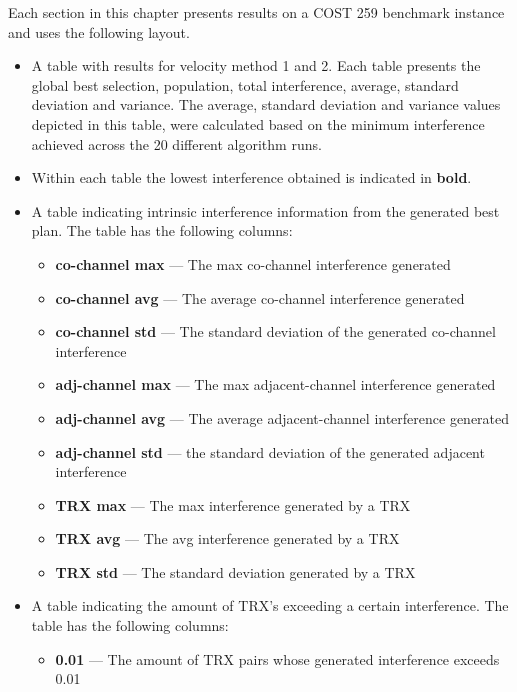 Each section in this chapter presents results on a \gls{COST} 259 benchmark instance and uses the following layout.
\begin{itemize}
        \item A table with results for velocity method 1 and 2. Each table presents the global best selection, population, total interference, average, standard deviation and variance. The average, standard deviation and variance values depicted in this table, were calculated based on the minimum interference achieved across the 20 different algorithm runs.
        \item Within each table the lowest interference obtained is indicated in \textbf{bold}.
        \item A table indicating intrinsic interference information from the generated best plan. The table has the following columns:
            \begin{itemize}
                \item{\textbf{co-channel max}} --- The max co-channel interference generated
                \item{\textbf{co-channel avg}} --- The average co-channel interference generated
                \item{\textbf{co-channel std}} --- The standard deviation of the generated co-channel interference
                \item{\textbf{adj-channel max}} --- The max adjacent-channel interference generated
                \item{\textbf{adj-channel avg}} --- The average adjacent-channel interference generated
                \item{\textbf{adj-channel std}} --- the standard deviation of the generated adjacent interference
                \item{\textbf{TRX max}} --- The max interference generated by a TRX
                \item{\textbf{TRX avg}} --- The avg interference generated by a TRX
                \item{\textbf{TRX std}} --- The standard deviation generated by a TRX
            \end{itemize}
        \item A table indicating the amount of TRX's exceeding a certain interference. The table has the following columns:
            \begin{itemize}
                \item{\textbf{0.01}} --- The amount of TRX pairs whose generated interference exceeds 0.01

\end{itemize}
\end{itemize}
